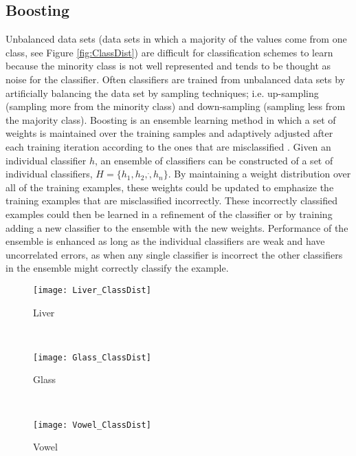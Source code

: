 \subsection{Boosting}
Unbalanced data sets (data sets in which a majority of the values come from one class, see Figure \ref{fig:ClassDist}) are difficult for classification schemes to learn because the minority class is not well represented and tends to be thought as noise for the classifier.
Often classifiers are trained from unbalanced data sets by artificially balancing the data set by sampling techniques; i.e. up-sampling (sampling more from the minority class) and down-sampling (sampling less from the majority class).
Boosting is an ensemble learning method in which a set of weights is maintained over the training samples and adaptively adjusted after each training iteration according to the ones that are misclassified \cite{li_adaboost_2008}.
Given an individual classifier $h$, an ensemble of classifiers can be constructed of a set of individual classifiers, $H=\{h_1, h_2,\dot, h_n\}$.
By maintaining a weight distribution over all of the training examples, these weights could be updated to emphasize the training examples that are misclassified incorrectly.  These incorrectly classified examples could then be learned in a refinement of the classifier or by training adding a new classifier to the ensemble with the new weights.
Performance of the ensemble is enhanced as long as the individual classifiers are weak and have uncorrelated errors, as when any single classifier is incorrect the other classifiers in the ensemble might correctly classify the example.
\begin{figure*}[ht!]
	\centering
	\begin{subfigure}[b]{0.3\textwidth}
		\centering
		\texttt{[image: Liver\_ClassDist]}
        \caption{Liver}
	\end{subfigure}%
	~
	\begin{subfigure}[b]{0.3\textwidth}
		\centering
		\texttt{[image: Glass\_ClassDist]}
        \caption{Glass}
	\end{subfigure}	
    ~
	\begin{subfigure}[b]{0.3\textwidth}
		\centering
		\texttt{[image: Vowel\_ClassDist]}
        \caption{Vowel}
	\end{subfigure}%
	\caption{Distribution of Class Data}
	\label{fig:ClassDist}
\end{figure*}

